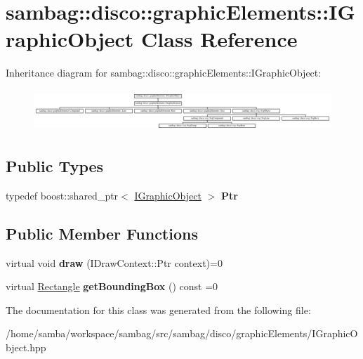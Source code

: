 \hypertarget{classsambag_1_1disco_1_1graphic_elements_1_1_i_graphic_object}{
\section{sambag::disco::graphicElements::IGraphicObject Class Reference}
\label{classsambag_1_1disco_1_1graphic_elements_1_1_i_graphic_object}
}
Inheritance diagram for sambag::disco::graphicElements::IGraphicObject:\begin{figure}[H]
\begin{center}
\leavevmode
\includegraphics[height=1.592719cm]{classsambag_1_1disco_1_1graphic_elements_1_1_i_graphic_object}
\end{center}
\end{figure}
\subsection*{Public Types}
\begin{DoxyCompactItemize}
\item 
\hypertarget{classsambag_1_1disco_1_1graphic_elements_1_1_i_graphic_object_a8e99161cf5d50d87bc975700187f2165}{
typedef boost::shared\_\-ptr$<$ \hyperlink{classsambag_1_1disco_1_1graphic_elements_1_1_i_graphic_object}{IGraphicObject} $>$ {\bfseries Ptr}}
\label{classsambag_1_1disco_1_1graphic_elements_1_1_i_graphic_object_a8e99161cf5d50d87bc975700187f2165}

\end{DoxyCompactItemize}
\subsection*{Public Member Functions}
\begin{DoxyCompactItemize}
\item 
\hypertarget{classsambag_1_1disco_1_1graphic_elements_1_1_i_graphic_object_aa1b0a1f97cc91380250083cdc52d7a15}{
virtual void {\bfseries draw} (IDrawContext::Ptr context)=0}
\label{classsambag_1_1disco_1_1graphic_elements_1_1_i_graphic_object_aa1b0a1f97cc91380250083cdc52d7a15}

\item 
\hypertarget{classsambag_1_1disco_1_1graphic_elements_1_1_i_graphic_object_ad25ba2dcecb8dce0daaff9e36f90cad9}{
virtual \hyperlink{classsambag_1_1com_1_1_rectangle}{Rectangle} {\bfseries getBoundingBox} () const =0}
\label{classsambag_1_1disco_1_1graphic_elements_1_1_i_graphic_object_ad25ba2dcecb8dce0daaff9e36f90cad9}

\end{DoxyCompactItemize}


The documentation for this class was generated from the following file:\begin{DoxyCompactItemize}
\item 
/home/samba/workspace/sambag/src/sambag/disco/graphicElements/IGraphicObject.hpp\end{DoxyCompactItemize}
